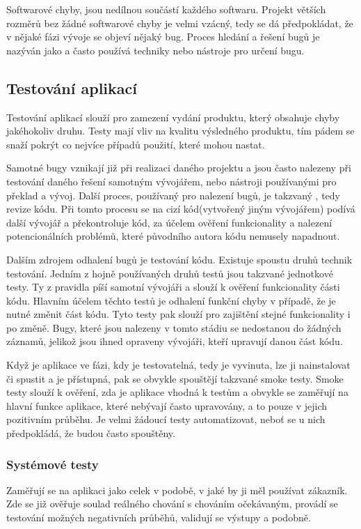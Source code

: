 \documentclass[czech,DP]{thesiskiv}
\begin{document}
Softwarové chyby, jsou nedílnou součástí každého softwaru. Projekt větších rozměrů bez žádné softwarové chyby je velmi vzácný, tedy se dá předpokládat, že v nějaké fázi vývoje se objeví nějaký bug. Proces hledání a řešení bugů je nazýván jako  a často používá techniky nebo nástroje pro určení bugu. 

\subsection{Testování aplikací}
Testování aplikací slouží pro zamezení vydání produktu, který obsahuje chyby jakéhokoliv druhu. Testy mají vliv na kvalitu výsledného produktu, tím pádem se snaží pokrýt co nejvíce případů použití, které mohou nastat.

Samotné bugy vznikají již při realizaci daného projektu a jsou často nalezeny při testování daného řešení samotným vývojářem, nebo nástroji používanými pro překlad a vývoj. Další proces, používaný pro nalezení bugů, je takzvaný , tedy revize kódu. Při tomto procesu se na cizí kód(vytvořený jiným vývojářem) podívá další vývojář a překontroluje kód, za účelem ověření funkcionality a nalezení potencionálních problémů, které původního autora kódu nemusely napadnout. 

Dalším zdrojem odhalení bugů je testování kódu. Existuje spoustu druhů technik testování. Jedním z hojně používaných druhů testů jsou takzvané jednotkové testy. Ty z pravidla píší samotní vývojáři a slouží k ověření funkcionality části kódu. Hlavním účelem těchto testů je odhalení funkční chyby v případě, že je nutné změnit část kódu. Tyto testy pak slouží pro zajištění stejné funkcionality i po změně. Bugy, které jsou nalezeny v tomto stádiu se nedostanou do žádných záznamů, jelikož jsou ihned opraveny vývojáři, kteří upravují danou část kódu.

Když je aplikace ve fázi, kdy je testovatelná, tedy je vyvinuta, lze ji nainstalovat či spustit a je přístupná, pak se obvykle spouštějí takzvané smoke testy. Smoke testy slouží k ověření, zda je aplikace vhodná k testům a obvykle se zaměřují na hlavní funkce aplikace, které nebývají často upravovány, a to pouze v jejich pozitivním průběhu. Je velmi žádoucí testy automatizovat, neboť se u nich předpokládá, že budou často spouštěny.

\subsubsection*{Systémové testy}
Zaměřují se na aplikaci jako celek v podobě, v jaké by ji měl používat zákazník. Zde se již ověřuje soulad reálného chování s chováním očekávaným, provádí se testování možných negativních průběhů, validují se výstupy a podobně.
\end{document}

